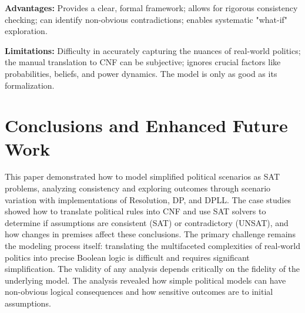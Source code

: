 \documentclass[11pt, a4paper]{article}
\begin{document}
\textbf{Advantages:} Provides a clear, formal framework; allows for rigorous consistency checking; can identify non-obvious contradictions; enables systematic "what-if" exploration.

\textbf{Limitations:} Difficulty in accurately capturing the nuances of real-world politics; the manual translation to CNF can be subjective; ignores crucial factors like probabilities, beliefs, and power dynamics. The model is only as good as its formalization.

\section{Conclusions and Enhanced Future Work} \label{sec:conclusions}

This paper demonstrated how to model simplified political scenarios as SAT problems, analyzing consistency and exploring outcomes through scenario variation with implementations of Resolution, DP, and DPLL. The case studies showed how to translate political rules into CNF and use SAT solvers to determine if assumptions are consistent (SAT) or contradictory (UNSAT), and how changes in premises affect these conclusions. The primary challenge remains the modeling process itself: translating the multifaceted complexities of real-world politics into precise Boolean logic is difficult and requires significant simplification. The validity of any analysis depends critically on the fidelity of the underlying model. The analysis revealed how simple political models can have non-obvious logical consequences and how sensitive outcomes are to initial assumptions.
\end{document}
